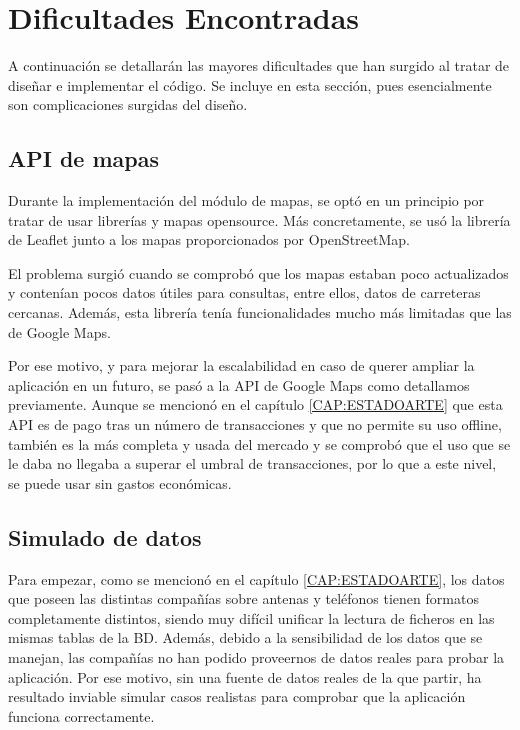 \section{Dificultades Encontradas\label{SEC:DIFICULTAD}}
  A continuación se detallarán las mayores dificultades que han surgido al tratar de diseñar e implementar el código. Se incluye en esta sección, pues esencialmente son complicaciones surgidas del diseño.
  
  \subsection{API de mapas}
    Durante la implementación del módulo de mapas, se optó en un principio por tratar de usar librerías y mapas opensource. Más concretamente, se usó la librería de Leaflet junto a los mapas proporcionados por OpenStreetMap.
    
    El problema surgió cuando se comprobó que los mapas estaban poco actualizados y contenían pocos datos útiles para consultas, entre ellos, datos de carreteras cercanas. Además, esta librería tenía funcionalidades mucho más limitadas que las de Google Maps.
    
    Por ese motivo, y para mejorar la escalabilidad en caso de querer ampliar la aplicación en un futuro, se pasó a la API de Google Maps como detallamos previamente. 
    Aunque se mencionó en el capítulo \ref{CAP:ESTADOARTE} que esta API es de pago tras un número de transacciones y que no permite su uso offline, también es la más completa y usada del mercado y se comprobó que el uso que se le daba no llegaba a superar el umbral de transacciones, por lo que a este nivel, se puede usar sin gastos económicas.
    
    
   \subsection{Simulado de datos}
    Para empezar, como se mencionó en el capítulo \ref{CAP:ESTADOARTE}, los datos que poseen las distintas compañías sobre antenas y teléfonos tienen formatos completamente distintos, siendo muy difícil unificar la lectura de ficheros en las mismas tablas de la BD.
    Además, debido a la sensibilidad de los datos que se manejan, las compañías no han podido proveernos de datos reales para probar la aplicación. 
    Por ese motivo, sin una fuente de datos reales de la que partir, ha resultado inviable simular casos realistas para comprobar que la aplicación funciona correctamente. 
    
